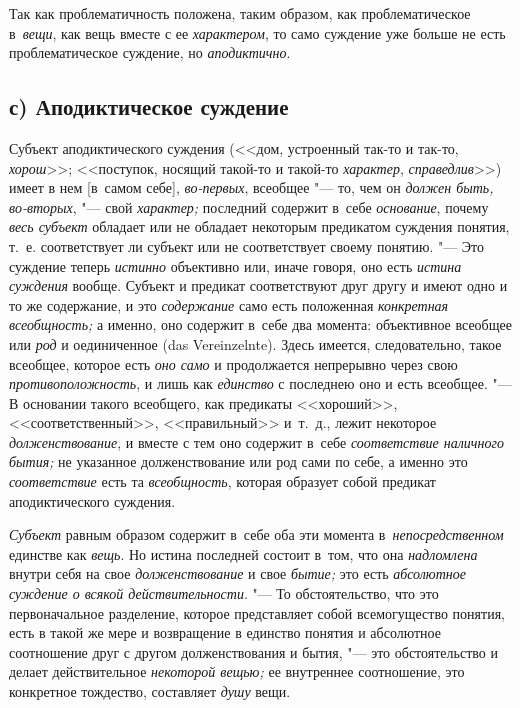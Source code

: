 \label{bkm:bm66b}Так как проблематичность положена, таким образом, как
проблематическое в~{\em вещи}, как вещь вместе с ее {\em характером}, то само
суждение уже больше не есть проблематическое суждение, но {\em аподиктично}.

\subsection[с) Аподиктическое суждение]{с) Аподиктическое суждение}

Субъект аподиктического суждения (<<дом, устроенный так-то и так-то,
{\em хорош}>>; <<поступок, носящий такой-то и такой-то {\em характер},
{\em справедлив}>>) имеет в нем [в~самом себе], {\em во-первых},
всеобщее "--- то, чем он {\em должен быть, во-вторых}, "--- свой
{\em характер;} последний содержит в~себе {\em основание}, почему
{\em весь субъект} обладает или не обладает некоторым предикатом суждения
понятия, т.~е. соответствует ли субъект или не соответствует своему
понятию. "--- Это суждение теперь {\em истинно} объективно или, иначе говоря,
оно есть {\em истина суждения} вообще. Субъект и предикат соответствуют друг
другу и имеют одно и то же содержание, и это {\em содержание} само есть
положенная {\em конкретная всеобщность;} а именно, оно содержит в~себе два
момента: объективное всеобщее или {\em род} и
оединиченное (das Verein\-zelnte). Здесь имеется, следовательно, такое
всеобщее, которое есть {\em оно само} и продолжается непрерывно через свою
{\em противоположность}, и лишь как {\em единство} с последнею оно и есть
всеобщее. "--- В основании такого всеобщего, как предикаты <<хороший>>,
<<соответственный>>, <<правильный>> и~т.~д., лежит некоторое
{\em долженствование}, и вместе с тем оно содержит в~себе {\em соответствие
наличного бытия;} не указанное долженствование или род сами по себе, а именно
это {\em соответствие} есть та {\em всеобщность}, которая образует собой
предикат аподиктического суждения.

{\em Субъект} равным образом содержит в~себе оба эти момента
в~{\em непосредственном} единстве как {\em вещь}. Но истина последней состоит
в~том, что она {\em надломлена} внутри себя на свое {\em долженствование}
и свое {\em бытие;} это есть {\em абсолютное суждение о всякой
действительности}. "--- То обстоятельство,
что это первоначальное разделение, которое представляет собой всемогущество
понятия, есть в такой же мере и возвращение в единство понятия и абсолютное
соотношение друг с другом долженствования и бытия, "--- это обстоятельство
и делает действительное {\em некоторой вещью;} ее внутреннее соотношение,
это конкретное тождество, составляет {\em душу} вещи.

